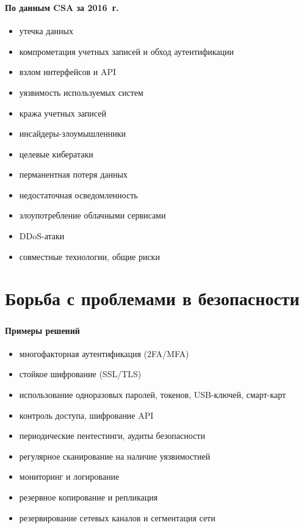 \begin{frame}
\frametitle{\insertsection}
\framesubtitle{По данным CSA за 2016~г.}

\begin{itemize}
    \item утечка данных
    \item компрометация учетных записей и обход аутентификации
    \item взлом интерфейсов и API
    \item уязвимость используемых систем
    \item кража учетных записей
    \item инсайдеры-злоумышленники
    \item целевые кибератаки
    \item перманентная потеря данных
    \item недостаточная осведомленность
    \item злоупотребление облачными сервисами
    \item DDoS-атаки
    \item совместные технологии, общие риски
\end{itemize}
\end{frame}


\section{Борьба с проблемами в безопасности}

\begin{frame}
\frametitle{\insertsection}
\framesubtitle{Примеры решений}

\begin{itemize}
    \item многофакторная аутентификация (2FA/MFA)
    \item стойкое шифрование (SSL/TLS)
    \item использование одноразовых паролей, токенов, USB-ключей, смарт-карт
    \item контроль доступа, шифрование API
    \item периодические пентестинги, аудиты безопасности
    \item регулярное сканирование на наличие уязвимостией
    \item мониторинг и логирование
    \item резервное копирование и репликация
    \item резервирование сетевых каналов и сегментация сети
\end{itemize}
\end{frame}

